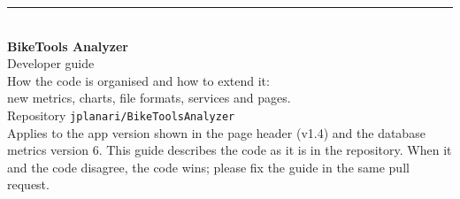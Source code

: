 


\begin{titlepage}
\raggedright
\vspace*{3cm}
{\color{accent}\rule{3cm}{4pt}}\\[1.2cm]
{\Huge\bfseries BikeTools Analyzer}\\[.4cm]
{\LARGE Developer guide}\\[1.2cm]
{\large How the code is organised and how to extend it:\\
new metrics, charts, file formats, services and pages.}\\[3cm]
{\color{muted}Repository \texttt{jplanari/BikeToolsAnalyzer}\\
Applies to the app version shown in the page header (v1.4) and the database
metrics version 6.}
\vfill
{\small\color{muted}This guide describes the code as it is in the repository. When it and the code disagree, the code wins;
please fix the guide in the same pull request.}
\end{titlepage}

\tableofcontents











